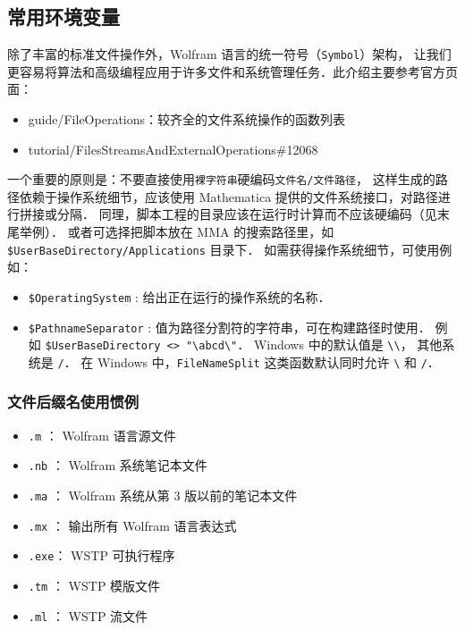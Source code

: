 
\begin{issues}
\issueDraft
\issueTODO
\end{issues}

\subsection{常用环境变量}

除了丰富的标准文件操作外，Wolfram 语言的统一符号（\verb`Symbol`）架构，
让我们更容易将算法和高级编程应用于许多文件和系统管理任务．此介绍主要参考官方页面：

\begin{itemize}
\item guide/FileOperations：较齐全的文件系统操作的函数列表
\item tutorial/FilesStreamsAndExternalOperations\#12068
\end{itemize}

一个重要的原则是：不要直接使用\verb`裸字符串`硬编码\verb`文件名/文件路径`， 
这样生成的路径依赖于操作系统细节，应该使用 Mathematica 提供的文件系统接口，对路径进行拼接或分隔．
同理，脚本工程的目录应该在运行时计算而不应该硬编码（见末尾举例）．
或者可选择把脚本放在 MMA 的搜索路径里，如 \verb`$UserBaseDirectory/Applications` 目录下．
如需获得操作系统细节，可使用例如：

\begin{itemize}
\item \verb`$OperatingSystem` : 给出正在运行的操作系统的名称．
\item \verb`$PathnameSeparator` : 值为路径分割符的字符串，可在构建路径时使用．
例如 \verb|$UserBaseDirectory <> "\abcd\"|． 
Windows 中的默认值是 \verb|\\|， 其他系统是 \verb|/|．
在 Windows 中，\verb`FileNameSplit` 这类函数默认同时允许 \verb|\| 和 \verb|/|．
\end{itemize}

\subsubsection{文件后缀名使用惯例}

\begin{itemize}
\item \verb`.m`  ： Wolfram 语言源文件
\item \verb`.nb` ： Wolfram 系统笔记本文件
\item \verb`.ma` ： Wolfram 系统从第 $3$ 版以前的笔记本文件
\item \verb`.mx` ： 输出所有 Wolfram 语言表达式
\item \verb`.exe`： WSTP 可执行程序
\item \verb`.tm` ： WSTP 模版文件
\item \verb`.ml` ： WSTP 流文件
\end{itemize}

